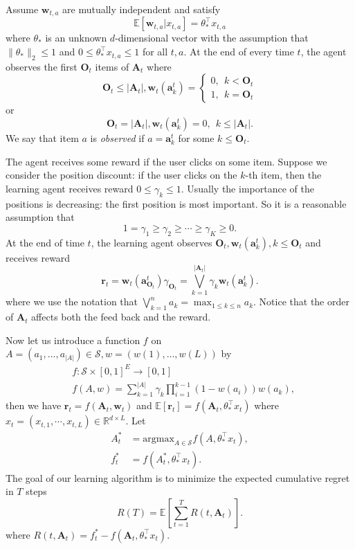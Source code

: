 \documentclass{article}
\newcommand{\EE}{\mathbb{E}}
\newcommand{\RR}{\mathbb{R}}
\newcommand{\bA}{\mathbf{A}}
\newcommand{\ba}{\mathbf{a}}
\newcommand{\bO}{\mathbf{O}}
\newcommand{\br}{\mathbf{r}}
\newcommand{\bw}{\mathbf{w}}
\newcommand{\cS}{\mathcal{S}}
\newcommand{\argmax}{\mathrm{argmax}}
\newcommand{\abs}[1]{\left| #1 \right|}
\newcommand{\norm}[1]{\| #1 \|}
\begin{document}
Assume $\bw_{t,a}$ are mutually independent and satisfy
\begin{equation}
\label{eq:expectation}
\EE[\bw_{t,a} | x_{t,a}] = \theta_{\ast}^{\top} x_{t,a}
\end{equation}
where $\theta_{\ast}$ is an unknown $d$-dimensional vector with the assumption that $\norm{\theta_{\ast}}_2 \leq 1$ and $0 \leq \theta_{\ast}^{\top} x_{t,a} \leq 1$ for all $t, a$. At the end of every time $t$, the agent observes the first $\bO_t$ items of $\bA_t$ where 
$$
\bO_t \leq \abs{\bA_t}, \bw_t(\ba_k^t) = \begin{cases} 0, ~~k < \bO_t \\ 1, ~~k = \bO_t \end{cases}
$$ 
or 
$$
\bO_t = \abs{\bA_t}, \bw_t(\ba_k^t) = 0, ~~ k \leq \abs{\bA_t}.
$$
We say that item $a$ is {\it observed} if $a = \ba_k^t$ for some $k \leq \bO_t$. 

The agent receives some reward if the user clicks on some item. Suppose we consider the position discount: if the user clicks on the $k$-th item, then the learning agent receives reward $0 \leq \gamma_k \leq 1$. Usually the importance of the positions is decreasing: the first position is most important. So it is a reasonable assumption that
$$
1 = \gamma_1 \geq \gamma_2 \geq \cdots \geq \gamma_K \geq 0.
$$
At the end of time $t$, the learning agent observes $\bO_t, \bw_t(\ba_k^t), k \leq \bO_t$ and receives reward
$$
\br_t = \bw_t(\ba_{\bO_t}^t) \gamma_{\bO_t} = \bigvee_{k=1}^{\abs{\bA_t}} \gamma_k \bw_t(\ba_k^t).
$$
where we use the notation that $\bigvee_{k=1}^n a_k = \max_{1 \leq k \leq n} a_k$. Notice that the order of $\bA_t$ affects both the feed back and the reward.

Now let us introduce a function $f$ on $A = (a_1,...,a_{\abs{A}}) \in \cS, w = (w(1),...,w(L))$ by
\begin{align*}
&f : \cS \times [0,1]^E \to [0,1]\\
&f(A,w) = \sum_{k = 1}^{\abs{A}} \gamma_{k} \prod_{i=1}^{k-1} (1 - w(a_i)) w(a_k),
\end{align*}
then we have $\br_t = f(\bA_t, \bw_t)$ and $\EE[\br_t] = f(\bA_t, \theta_{\ast}^{\top}x_t)$ where $x_t = (x_{t,1}, \cdots, x_{t,L}) \in \RR^{d \times L}$. Let 
\begin{align*}
A_t^{\ast} &= \argmax_{A\in \cS} f(A,\theta_{\ast}^{\top}x_t),\\
f_t^{\ast} &= f(A_t^{\ast}, \theta_{\ast}^{\top}x_t).
\end{align*}
The goal of our learning algorithm is to minimize the expected cumulative regret in $T$ steps
$$
R(T) = \EE[\sum_{t=1}^T R(t, \bA_t)].
$$
where $R(t, \bA_t) = f_t^{\ast} - f(\bA_t, \theta_{\ast}^{\top}x_t)$.
\end{document}
